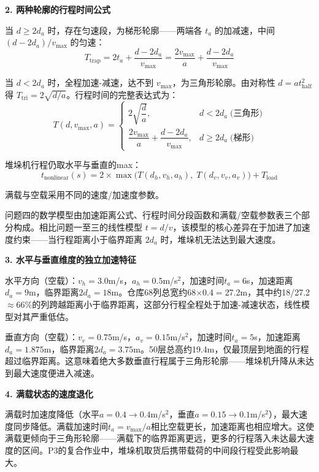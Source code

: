 \documentclass[a4paper]{cumcmthesis}
\begin{document}
\textbf{2. 两种轮廓的行程时间公式}

当 $d\geq 2d_a$ 时，存在匀速段，为梯形轮廓——两端各 $t_a$ 的加减速，中间 $(d-2d_a)/v_{\max}$ 的匀速：
\begin{equation}
T_{\text{trap}} = 2t_a + \frac{d-2d_a}{v_{\max}} = \frac{2v_{\max}}{a} + \frac{d-2d_a}{v_{\max}}
\end{equation}

当 $d<2d_a$ 时，全程加速-减速，达不到 $v_{\max}$，为三角形轮廓。由对称性 $d=at_{\text{half}}^2$ 得 $T_{\text{tri}} = 2\sqrt{d/a}$。行程时间的完整表达式为：
\begin{equation}
T(d,v_{\max},a)=
\begin{cases}
2\sqrt{\dfrac{d}{a}}, & d<2d_a \;\text{(三角形)}\\[10pt]
\dfrac{2v_{\max}}{a}+\dfrac{d-2d_a}{v_{\max}}, & d\geq 2d_a \;\text{(梯形)}
\end{cases}
\end{equation}

堆垛机行程仍取水平与垂直的max：
\begin{equation}
t_{\text{nonlinear}}(s)=2\times\max\big(T(d_h,v_h,a_h),\; T(d_v,v_v,a_v)\big)+T_{\text{load}}
\end{equation}

满载与空载采用不同的速度/加速度参数。

问题四的数学模型由加速距离公式、行程时间分段函数和满载/空载参数表三个部分构成。相比问题一至三的线性模型 $t=d/v$，该模型的核心差异在于加进了加速度约束——当行程距离小于临界距离 $2d_a$ 时，堆垛机无法达到最大速度。

\textbf{3. 水平与垂直维度的独立加速特征}

水平方向（空载）：$v_h=3.0$m/s，$a_h=0.5$m/s$^2$，加速时间$t_a=6$s，加速距离$d_a=9$m，临界距离$2d_a=18$m。仓库68列总宽约68$\times$0.4$=$27.2m，其中约18/27.2$\approx$66\%的列跨越距离小于临界距离，这部分行程全程处于加速-减速状态，线性模型对其严重低估。

垂直方向（空载）：$v_v=0.75$m/s，$a_v=0.15$m/s$^2$，加速时间$t_a=5$s，加速距离$d_a=1.875$m，临界距离$2d_a=3.75$m。50层总高约19.4m，仅最顶层到地面的行程超过临界距离。这意味着绝大多数垂直行程属于三角形轮廓——堆垛机升降从未达到最大速度便进入减速。

\textbf{4. 满载状态的速度退化}

满载时加速度降低（水平$a=0.4\to0.4$m/s$^2$，垂直$a=0.15\to0.1$m/s$^2$），最大速度同步降低。满载加速时间$t_a=v_{\max}/a$相比空载更长，加速距离也相应增大。这使满载更倾向于三角形轮廓——满载下的临界距离更远，更多的行程落入未达最大速度的区间。P3的复合作业中，堆垛机取货后携带载荷的中间段行程受此影响最大。
\end{document}

